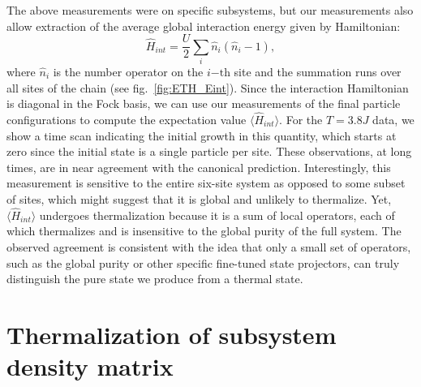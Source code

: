 The above measurements were on specific subsystems, but our measurements also allow extraction of the average global interaction energy given by Hamiltonian:
\begin{equation}
\hat{H}_{int}=\frac{U}{2}\sum_i \hat{n}_i(\hat{n}_i-1),
\end{equation}
where $\hat{n}_i$ is the number operator on the $i\mathrm{-th}$ site and the summation runs over all sites of the chain (see fig.~\ref{fig:ETH_Eint}). Since the interaction Hamiltonian is diagonal in the Fock basis, we can use our measurements of the final particle configurations to compute the expectation value $\langle \hat{H}_{int} \rangle$. For the $T=3.8J$ data, we show a time scan indicating the initial growth in this quantity, which starts at zero since the initial state is a single particle per site.  These observations, at long times, are in near agreement with the canonical prediction. Interestingly, this measurement is sensitive to the entire six-site system as opposed to some subset of sites, which might suggest that it is global and unlikely to thermalize. Yet, $\langle \hat{H}_{int} \rangle$ undergoes thermalization because it is a sum of local operators, each of which thermalizes and is insensitive to the global purity of the full system.  The observed agreement is consistent with the idea that only a small set of operators, such as the global purity or other specific fine-tuned state projectors, can truly distinguish the pure state we produce from a thermal state.

\section{Thermalization of subsystem density matrix}

